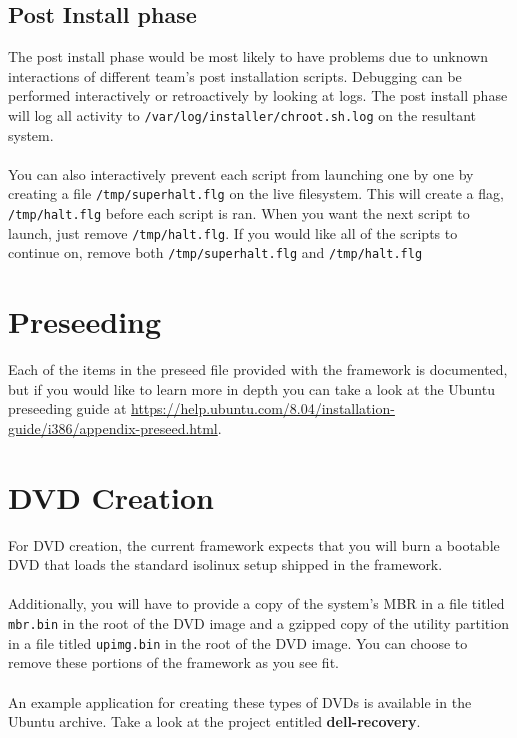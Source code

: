 \documentclass[letterpaper,10pt,titlepage]{article}
\begin{document}
\subsection{Post Install phase}
The post install phase would be most likely to have problems due to unknown interactions of different team's post installation scripts.
Debugging can be performed interactively or retroactively by looking at logs.  The post install phase will log all activity to \texttt{/var/log/installer/chroot.sh.log} on the resultant system.
\\
\\
You can also interactively prevent each script from launching one by one by creating a file \texttt{/tmp/superhalt.flg} on the live filesystem.  This will create a flag, \texttt{/tmp/halt.flg} before each script is ran.  When you want the next script to launch, just remove \texttt{/tmp/halt.flg}.  If you would like all of the scripts to continue on, remove both \texttt{/tmp/superhalt.flg} and \texttt{/tmp/halt.flg}

\section{Preseeding}
Each of the items in the preseed file provided with the framework is documented, but if you would like to learn more in depth you can take a look at the Ubuntu preseeding guide at \url{https://help.ubuntu.com/8.04/installation-guide/i386/appendix-preseed.html}.

\section{DVD Creation}
For DVD creation, the current framework expects that you will burn a bootable DVD that loads the standard isolinux setup shipped in the framework.
\\
\\
Additionally, you will have to provide a copy of  the system's MBR in a file titled \texttt{mbr.bin} in the root of the DVD image and a gzipped copy of the utility partition in a file titled \texttt{upimg.bin} in the root of the DVD image.  You can choose to remove these portions of the framework as you see fit.
\\
\\
An example application for creating these types of DVDs is available in the Ubuntu archive.  Take a look at the project entitled \textbf{dell-recovery}.
\end{document}
